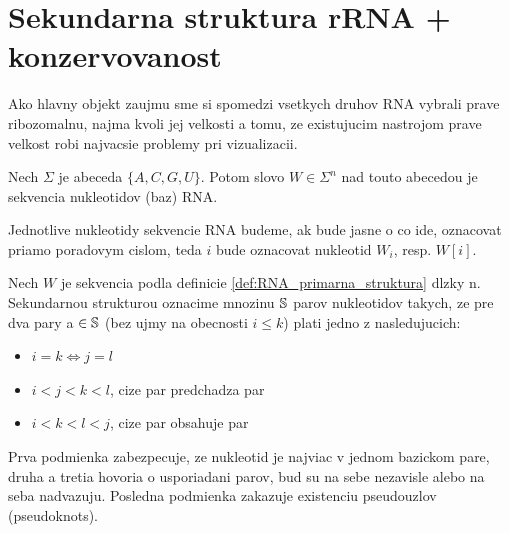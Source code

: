 \section{Sekundarna struktura rRNA + konzervovanost}

Ako hlavny objekt zaujmu sme si spomedzi vsetkych druhov RNA vybrali prave ribozomalnu,
najma kvoli jej velkosti a tomu, ze existujucim nastrojom prave velkost robi najvacsie problemy
pri vizualizacii.

\begin{definice}
  \label{def:RNA_primarna_struktura}
	Nech $\Sigma$ je abeceda $\{A, C, G, U\}$. Potom slovo $W \in \Sigma^n$ nad touto abecedou
	je sekvencia nukleotidov (baz) RNA.
\end{definice}

Jednotlive nukleotidy sekvencie RNA budeme, ak bude jasne o co ide, oznacovat priamo poradovym
cislom, teda $i$ bude oznacovat nukleotid $W_{i}$, resp. $W[i]$.

\begin{definice}
  \label{def:RNA_sekundarna_struktura}
	Nech $W$ je sekvencia podla definicie \ref{def:RNA_primarna_struktura} dlzky n.
	Sekundarnou strukturou oznacime mnozinu $\mathbb{S}$ parov nukleotidov  takych, ze
	pre dva pary  a  $\in \mathbb{S}$ (bez ujmy na obecnosti $i \leq k$)
  plati jedno z nasledujucich:
	\begin{itemize}
		\item $i = k \iff j = l$
		\item $i < j < k < l$, cize par  predchadza par 
		\item $i < k < l < j$, cize par  obsahuje par 
	\end{itemize}
\end{definice}


Prva podmienka zabezpecuje, ze nukleotid je najviac v jednom bazickom pare, druha a tretia
hovoria o usporiadani parov, bud su na sebe nezavisle alebo na seba nadvazuju.
Posledna podmienka zakazuje existenciu pseudouzlov (pseudoknots).


